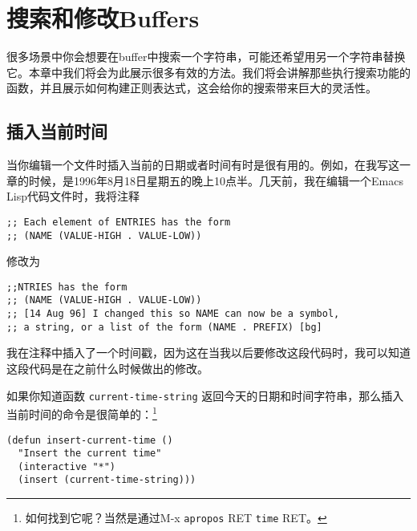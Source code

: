 \chapter{搜索和修改Buffers}
\label{chapter:04-Searching-and-Modifying-Buffers}


很多场景中你会想要在buffer中搜索一个字符串，可能还希望用另一个字符串替换它。本章中我们将会为此展示很多有效的方法。我们将会讲解那些执行搜索功能的函数，并且展示如何构建正则表达式，这会给你的搜索带来巨大的灵活性。

\section{插入当前时间}
\label{section:04-Inserting-the-Current-Time}

当你编辑一个文件时插入当前的日期或者时间有时是很有用的。例如，在我写这一章的时候，是1996年8月18日星期五的晚上10点半。几天前，我在编辑一个Emacs Lisp代码文件时，我将注释

\begin{verbatim}
;; Each element of ENTRIES has the form
;; (NAME (VALUE-HIGH . VALUE-LOW))
\end{verbatim}

修改为

\begin{verbatim}
;;NTRIES has the form
;; (NAME (VALUE-HIGH . VALUE-LOW))
;; [14 Aug 96] I changed this so NAME can now be a symbol,
;; a string, or a list of the form (NAME . PREFIX) [bg]
\end{verbatim}

我在注释中插入了一个时间戳，因为这在当我以后要修改这段代码时，我可以知道这段代码是在之前什么时候做出的修改。

如果你知道函数 \texttt{current-time-string} 返回今天的日期和时间字符串，那么插入当前时间的命令是很简单的：\footnote{如何找到它呢？当然是通过M-x \texttt{apropos} RET \texttt{time} RET。}

\begin{verbatim}
(defun insert-current-time ()
  "Insert the current time"
  (interactive "*")
  (insert (current-time-string)))
\end{verbatim}

